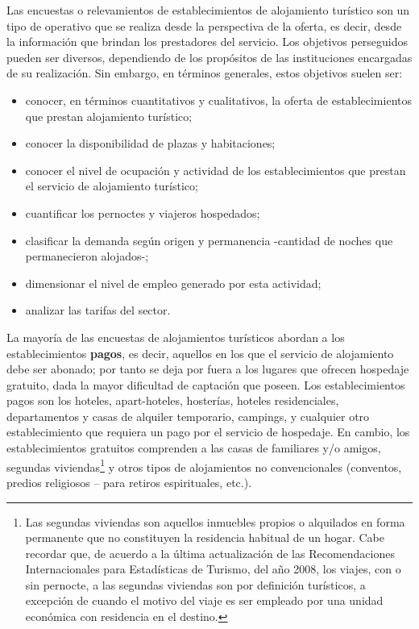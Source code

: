 \documentclass[
]{book}
\begin{document}
Las encuestas o relevamientos de establecimientos de alojamiento turístico son un tipo de operativo que se realiza desde la perspectiva de la oferta, es decir, desde la información que brindan los prestadores del servicio. Los objetivos perseguidos pueden ser diversos, dependiendo de los propósitos de las instituciones encargadas de su realización. Sin embargo, en términos generales, estos objetivos suelen ser:

\begin{itemize}
\item
  conocer, en términos cuantitativos y cualitativos, la oferta de establecimientos que prestan alojamiento turístico;
\item
  conocer la disponibilidad de plazas y habitaciones;
\item
  conocer el nivel de ocupación y actividad de los establecimientos que prestan el servicio de alojamiento turístico;
\item
  cuantificar los pernoctes y viajeros hospedados;
\item
  clasificar la demanda según origen y permanencia -cantidad de noches que permanecieron alojados-;
\item
  dimensionar el nivel de empleo generado por esta actividad;
\item
  analizar las tarifas del sector.
\end{itemize}

La mayoría de las encuestas de alojamientos turísticos abordan a los establecimientos \textbf{pagos}, es decir, aquellos en los que el servicio de alojamiento debe ser abonado; por tanto se deja por fuera a los lugares que ofrecen hospedaje gratuito, dada la mayor dificultad de captación que poseen. Los establecimientos pagos son los hoteles, apart-hoteles, hosterías, hoteles residenciales, departamentos y casas de alquiler temporario, campings, y cualquier otro establecimiento que requiera un pago por el servicio de hospedaje. En cambio, los establecimientos gratuitos comprenden a las casas de familiares y/o amigos, segundas viviendas\footnote{Las segundas viviendas son aquellos inmuebles propios o alquilados en forma permanente que no constituyen la residencia habitual de un hogar. Cabe recordar que, de acuerdo a la última actualización de las Recomendaciones Internacionales para Estadísticas de Turismo, del año 2008, los viajes, con o sin pernocte, a las segundas viviendas son por definición turísticos, a excepción de cuando el motivo del viaje es ser empleado por una unidad económica con residencia en el destino.} y otros tipos de alojamientos no convencionales (conventos, predios religiosos -- para retiros espirituales, etc.).
\end{document}
